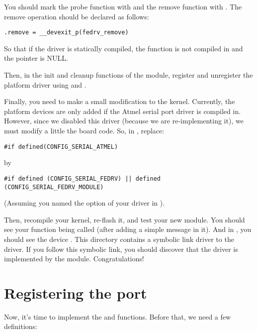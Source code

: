 You should mark the probe function with  and the remove
function with . The remove operation should be declared as
follows:

\begin{verbatim}
.remove = __devexit_p(fedrv_remove)
\end{verbatim}

So that if the driver is statically compiled, the
 function is not compiled in and the
 pointer is NULL.

Then, in the init and cleanup functions of the module, register and
unregister the platform driver using
 and
.

Finally, you need to make a small modification to the
kernel. Currently, the  platform devices are only added
if the Atmel serial port driver is compiled in. However, since we
disabled this driver (because we are re-implementing it), we must
modify a little the board code. So, in
, replace:

\begin{verbatim}
#if defined(CONFIG_SERIAL_ATMEL)
\end{verbatim}

by

\begin{verbatim}
#if defined (CONFIG_SERIAL_FEDRV) || defined (CONFIG_SERIAL_FEDRV_MODULE)
\end{verbatim}

(Assuming you named the option of your driver  in
).

Then, recompile your kernel, re-flash it, and test your new
module. You should see your  function being called
(after adding a simple  message in it). And in
, you should see the device
. This directory contains a symbolic link driver
to the  driver. If you follow this symbolic link,
you should discover that the  driver is implemented
by the  module. Congratulations!

\section{Registering the port}

Now, it's time to implement the  and 
functions. Before that, we need a few definitions:

